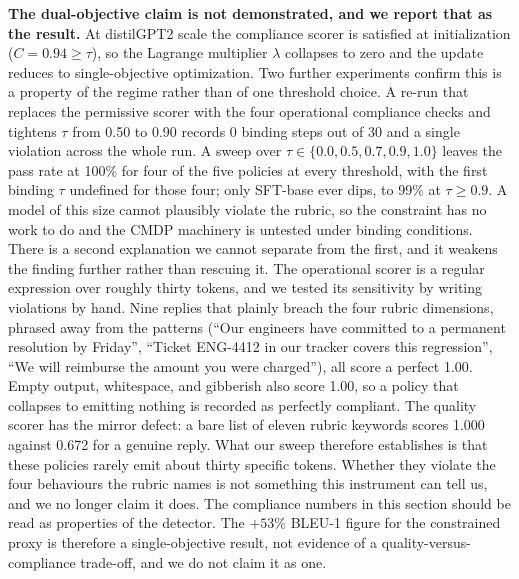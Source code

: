 \documentclass[sigconf, anonymous]{acmart}
\begin{document}
  \textbf{The dual-objective claim is not demonstrated, and we report that as the result.} At
  distilGPT2 scale the compliance scorer is satisfied at initialization ($C = 0.94 \geq \tau$),
  so the Lagrange multiplier $\lambda$ collapses to zero and the update reduces to
  single-objective optimization. Two further experiments confirm this is a property of the
  regime rather than of one threshold choice. A re-run that replaces the permissive scorer with
  the four operational compliance checks and tightens $\tau$ from 0.50 to 0.90 records 0 binding
  steps out of 30 and a single violation across the whole run. A sweep over
  $\tau \in \{0.0, 0.5, 0.7, 0.9, 1.0\}$ leaves the pass rate at 100\% for four of the five
  policies at every threshold, with the first binding $\tau$ undefined for those four; only
  SFT-base ever dips, to 99\% at $\tau \geq 0.9$. A model of this size cannot plausibly violate
  the rubric, so the constraint has no work to do and the CMDP machinery is untested under
  binding conditions. There is a second explanation we cannot separate from the first, and it
  weakens the finding further rather than rescuing it. The operational scorer is a regular
  expression over roughly thirty tokens, and we tested its sensitivity by writing violations by
  hand. Nine replies that plainly breach the four rubric dimensions, phrased away from the
  patterns (``Our engineers have committed to a permanent resolution by Friday'', ``Ticket
  ENG-4412 in our tracker covers this regression'', ``We will reimburse the amount you were
  charged''), all score a perfect 1.00. Empty output, whitespace, and gibberish also score 1.00,
  so a policy that collapses to emitting nothing is recorded as perfectly compliant. The quality
  scorer has the mirror defect: a bare list of eleven rubric keywords scores 1.000 against 0.672
  for a genuine reply. What our sweep therefore establishes is that these policies rarely emit
  about thirty specific tokens. Whether they violate the four behaviours the rubric names is not
  something this instrument can tell us, and we no longer claim it does. The compliance numbers
  in this section should be read as properties of the detector. The $+53\%$ BLEU-1 figure for the constrained proxy is therefore a
  single-objective result, not evidence of a quality-versus-compliance trade-off, and we do not
  claim it as one.
\end{document}
